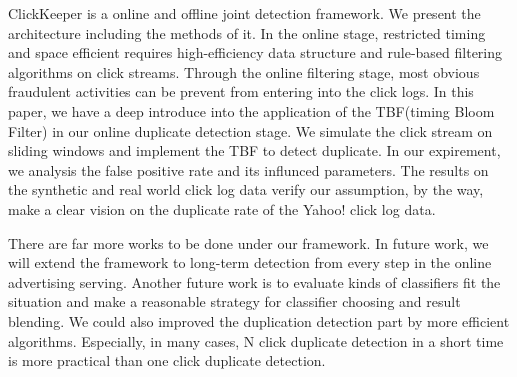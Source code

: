 \documentclass[runningheads,report]{llncs}
\begin{document}
ClickKeeper is a online and offline joint detection framework. We present the architecture including the methods of it. In the online stage, restricted timing and space efficient requires high-efficiency data structure and rule-based filtering algorithms on click streams. Through the online filtering stage, most obvious fraudulent activities can be prevent from entering into the click logs. In this paper, we have a deep introduce into the application of the TBF(timing Bloom Filter) in our online duplicate detection stage. We simulate the click stream on sliding windows and implement the TBF to detect duplicate. In our expirement, we analysis the false positive rate and its influnced parameters. The results on the synthetic and real world click log data verify our assumption, by the way, make a clear vision on the duplicate rate of the Yahoo! click log data. 


There are far more works to be done under our framework. In future work, we will extend the framework to long-term detection from every step in the online advertising serving. Another future work is to evaluate kinds of classifiers fit the situation and make a reasonable strategy for classifier choosing and result blending. We could also improved the duplication detection part by more efficient algorithms. Especially, in many cases, N click duplicate detection in a short time is more practical than one click duplicate detection. 

%
%
%
%
%
%
%


\end{document}
